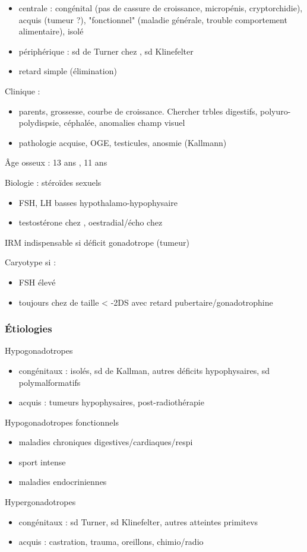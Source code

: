 \documentclass[11pt]{article}
\begin{document}
\begin{itemize}
\item centrale : congénital (pas de cassure de croissance, micropénis,
cryptorchidie), acquis (tumeur ?), "fonctionnel" (maladie générale, trouble
comportement alimentaire), isolé
\item périphérique : sd de Turner chez \female, sd Klinefelter \male
\item retard simple (élimination)
\end{itemize}

Clinique : 
\begin{itemize}
\item parents, grossesse, courbe de croissance. Chercher trbles digestifs, polyuro-polydispsie, céphalée, anomalies champ visuel
\item pathologie acquise, OGE, testicules, anosmie (Kallmann)
\end{itemize}

Âge osseux : 13 ans \male, 11 ans \female

Biologie : stéroïdes sexuels
\begin{itemize}
\item FSH, LH basses \thus hypothalamo-hypophysaire
\item testostérone chez \male, oestradial/écho chez \female
\end{itemize}

IRM indispensable si déficit gonadotrope (tumeur) \danger

Caryotype si :
\begin{itemize}
\item FSH élevé
\item toujours chez \female{} de taille < -2DS avec retard pubertaire/gonadotrophine \inc
\end{itemize}

\subsubsection{Étiologies}
\label{sec:org6538771}
Hypogonadotropes
\begin{itemize}
\item congénitaux : isolés, sd de Kallman, autres déficits hypophysaires, sd
polymalformatifs
\item acquis : tumeurs hypophysaires, post-radiothérapie
\end{itemize}
Hypogonadotropes fonctionnels
\begin{itemize}
\item maladies chroniques digestives/cardiaques/respi
\item sport intense
\item maladies endocriniennes
\end{itemize}
Hypergonadotropes
\begin{itemize}
\item congénitaux : sd Turner, sd Klinefelter, autres atteintes primitevs
\item acquis : castration, trauma, oreillons, chimio/radio
\end{itemize}
\end{document}

